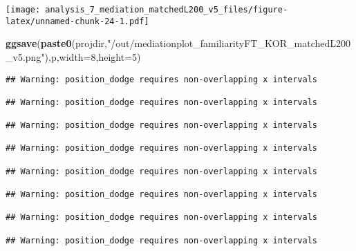 \documentclass[
]{article}
\newenvironment{Shaded}{\begin{snugshade}}{\end{snugshade}}
\newcommand{\DataTypeTok}[1]{\textcolor[rgb]{0.13,0.29,0.53}{#1}}
\newcommand{\DecValTok}[1]{\textcolor[rgb]{0.00,0.00,0.81}{#1}}
\newcommand{\KeywordTok}[1]{\textcolor[rgb]{0.13,0.29,0.53}{\textbf{#1}}}
\newcommand{\NormalTok}[1]{#1}
\newcommand{\StringTok}[1]{\textcolor[rgb]{0.31,0.60,0.02}{#1}}
\begin{document}
\texttt{[image: analysis\_7\_mediation\_matchedL200\_v5\_files/figure-latex/unnamed-chunk-24-1.pdf]}

\begin{Shaded}
\begin{Highlighting}[]
\KeywordTok{ggsave}\NormalTok{(}\KeywordTok{paste0}\NormalTok{(projdir,}\StringTok{"/out/mediationplot_familiarityFT_KOR_matchedL200_v5.png"}\NormalTok{),p,}\DataTypeTok{width=}\DecValTok{8}\NormalTok{,}\DataTypeTok{height=}\DecValTok{5}\NormalTok{)}
\end{Highlighting}
\end{Shaded}

\begin{verbatim}
## Warning: position_dodge requires non-overlapping x intervals

## Warning: position_dodge requires non-overlapping x intervals

## Warning: position_dodge requires non-overlapping x intervals

## Warning: position_dodge requires non-overlapping x intervals

## Warning: position_dodge requires non-overlapping x intervals

## Warning: position_dodge requires non-overlapping x intervals

## Warning: position_dodge requires non-overlapping x intervals

## Warning: position_dodge requires non-overlapping x intervals
\end{verbatim}
\end{document}
